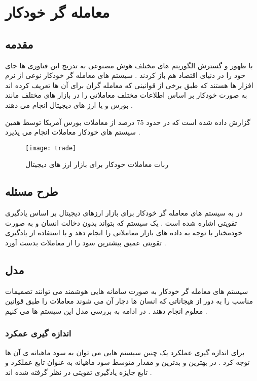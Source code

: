 \chapter{معامله گر خودکار}
\section{مقدمه}
\par
با ظهور و گسترش الگوریتم های مختلف هوش مصنوعی به تدریج این فناوری ها جای خود را در دنیای اقتصاد هم باز کردند . سیستم های معامله گر خودکار نوعی از نرم افزار ها هستند که طبق برخی از قوانینی که معامله گران برای آن ها تعریف کرده اند به صورت خودکار بر اساس اطلاعات مختلف معاملاتی را در بازار های مختلف مانند بورس و یا ارز های دیجیتال انجام می دهند . 

گزارش داده شده است که در حدود 75 درصد از معاملات بورس آمریکا توسط همین سیستم های خودکار معاملات انجام می پذیرد
\cite{chan2021quantitative}
.
\begin{figure}[h]
	\texttt{[image: trade]}
	\centering
	\caption{ربات  معاملات خودکار برای  بازار ارز های دیجیتال}
	\cite{cryptohopper}
	\label{trade:fig1}
\end{figure} 
\section{طرح مسئله}
در
\cite{tran2023optimizing}
به سیستم های معامله گر خودکار برای بازار ارزهای دیجیتال بر اساس یادگیری تقویتی اشاره شده است . یک سیستم که بتواند بدون دخالت انسان و به صورت خودمختار با توجه به داده های بازار معاملاتی را انجام دهد و با استفاده از یادگیری تقویتی عمیق بیشترین سود را از معاملات بدست آورد .

\section{مدل} 
سیستم های معامله گر خودکار به صورت سامانه هایی هوشمند می توانند تصمیمات مناسب را به دور از هیجاناتی که انسان ها دچار آن می شوند معاملات را طبق قوانین معلوم انجام دهند . در ادامه به بررسی مدل این سیستم ها می کنیم .
\subsection{اندازه گیری عمکرد} 
برای اندازه گیری عملکرد یک چنین سیستم هایی می توان به سود ماهیانه ی آن ها توجه کرد . در 
\cite{tran2023optimizing}
بهترین و بدترین و مقدار متوسط سود ماهیانه به عنوان تابع عملکرد و تابع جایزه یادگیری تقویتی در نظر گرفته شده اند .
